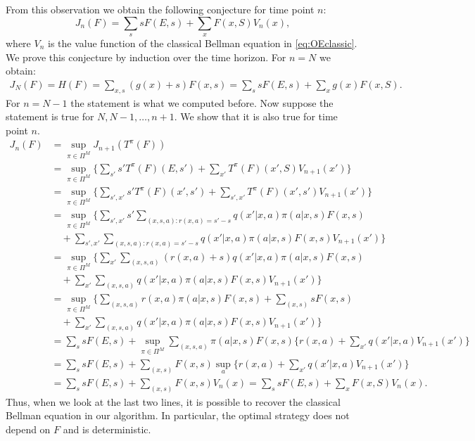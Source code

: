 \documentclass[reqno, 12pt]{amsart}%
\theoremstyle{definition}
\numberwithin{equation}{section} \numberwithin{theorem}{section}
\begin{document}
From this observation we obtain the following conjecture for time point $n$:
$$ J_n(F)=\sum_s s F(E,s) + \sum_{x} F(x,S) V_n(x),$$
where $V_n$ is the value function of the classical Bellman equation in \eqref{eq:OEclassic}. We prove this conjecture by
 induction over the time horizon. For $n=N$ we obtain:
\begin{align*}
J_N(F)= H(F) = \sum_{x,s} (g(x)+s) F(x,s) 
= \sum_{s} s F(E,s)+ \sum_{x} g(x) F(x,S).  
\end{align*}
For $n=N-1$ the statement is what we computed before. Now suppose the statement is true for $N,N-1,\ldots,n+1.$ We show that it is also true for time point $n.$
\begin{align*}
J_n(F)&=\sup_{\pi\in\Pi^M} J_{n+1}(T^\pi(F)) \\
&=  \sup_{\pi\in\Pi^M} \Big\{\sum_{s'} s' T^\pi(F)
(E,s') + \sum_{x'}  T^\pi(F)(x',S) V_{n+1}
(x')\Big\}\\
&=  \sup_{\pi\in\Pi^M} \Big\{\sum_{s',x'} s' 
T^\pi(F)(x',s') + \sum_{s',x'}  T^\pi(F)
(x',s') V_{n+1}(x') \Big\}\\
&=  \sup_{\pi\in\Pi^M}\Big\{ \sum_{s',x'} s' 
\sum_{(x,s,a) :  r(x,a)=s'-s}  q(x'|x,a) 
\pi(a|x,s) F(x,s) \\ & \quad  + \sum_{s',x'}  \sum_{(x,s,a) : r(x,a)=s'-s} q(x'|x,a) 
\pi(a|x,s) F(x,s) V_{n+1}(x')\Big\}\\
 &=  \sup_{\pi\in\Pi^M} \Big\{\sum_{x'}  \sum_{(x,s,a) } (r(x,a)+s) q(x'|x,a) \pi(a|x,s) F(x,s) \\  &\quad  + \sum_{x'}  \sum_{(x,s,a) }  q(x'|x,a) \pi(a|x,s) F(x,s) V_{n+1}(x') \Big\}\\
&=  \sup_{\pi\in\Pi^M} \Big\{ \sum_{(x,s,a) } r(x,a)  \pi(a|x,s) F(x,s) +  \sum_{(x,s) } s  
F(x,s)\\ & \quad  + \sum_{x'}  \sum_{(x,s,a) } 
q(x'|x,a) \pi(a|x,s) F(x,s) V_{n+1}(x')\Big\}\\
&=  \sum_{s} s  F(E,s)+ \sup_{\pi\in\Pi^M}  
\sum_{(x,s,a) }   \pi(a|x,s) F(x,s) \{r(x,a)+  
\sum_{x'}   q(x'|x,a)  V_{n+1}(x')\} \\
&=  \sum_{s} s  F(E,s)+   \sum_{(x,s) }   
F(x,s) \sup_a  \{r(x,a)+  \sum_{x'}   
q(x'|x,a)  V_{n+1}(x')\}  \\
&=  \sum_{s} sF(E,s)+\sum_{(x,s)}F(x,s) V_{n}(x) =  \sum_{s} s  F(E,s)+ \sum_{x }F(x,S) V_{n}(x).
\end{align*}
Thus, when we look at the last two lines, it is possible to recover the classical Bellman equation in our algorithm. In particular, the optimal strategy does not depend on $F$ and is deterministic.
\end{document}
